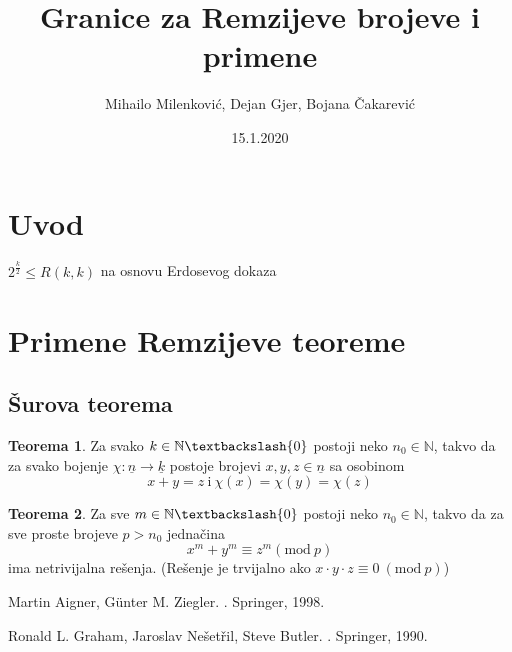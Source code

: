 \documentclass{article}
\title{Granice za Remzijeve brojeve i primene}
\date{15.1.2020}
\author{Mihailo Milenković, Dejan Gjer, Bojana Čakarević}
\theoremstyle{definition}
\newtheorem{teorema}{Teorema}[section]
\begin{document}
	
	\maketitle
	
	\newpage
	
	\tableofcontents
	
	\newpage
	
	\section{Uvod}
	
	$ 2^{\frac{k}{2}} \leq R(k,k)$ na osnovu Erdosevog dokaza \cite{theBook}
	
	\lipsum[1]

	\newpage
	
	\section{Primene Remzijeve teoreme}
	
	\subsection{Šurova teorema}
	\begin{teorema} \label{sur}
		Za svako $k \in \mathbb{N}\textbackslash \{0\}$  postoji neko $n_{0} \in \mathbb{N}$, takvo da za svako bojenje $\chi:\underline{n} \rightarrow \underline{k}$ postoje brojevi $x, y, z \in \underline{n}$ sa osobinom 
		\[
		x + y = z \: \mathrm{i} \: \chi(x)= \chi(y)=\chi(z)
		\]
	\end{teorema}
	
	\begin{teorema} \label{sur2}
		 Za sve $m \in \mathbb{N} \textbackslash \{0\}$ postoji neko $n_{0} \in \mathbb{N}$, takvo da za sve proste brojeve $p>n_{0}$ jednačina
		\[
		x^{m}+y^{m}\equiv z^{m} (\mathrm{mod} \: p) 
		\]
		ima netrivijalna rešenja. (Rešenje je trvijalno ako $x\cdot y \cdot z\equiv 0\: (\mathrm{mod} \: p)$)
	\end{teorema}
	
	
	\newpage
	
\begin{thebibliography}{99}
	Martin Aigner, Günter M. Ziegler.
	.
	\newblock Springer, 1998.
	
	Ronald L. Graham, Jaroslav Nešetřil, Steve Butler.
	.
	\newblock Springer, 1990.
	
\end{thebibliography}	
	
\end{document}
